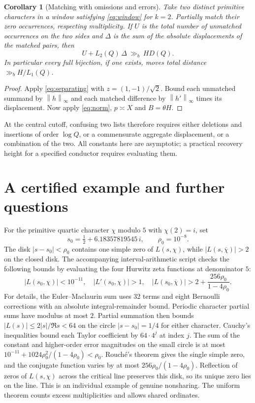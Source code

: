 \documentclass[11pt]{article}
\newtheorem{corollary}[theorem]{Corollary}
\newcommand{\norm}[1]{\left\lVert #1\right\rVert}
\begin{document}
\begin{corollary}[Matching with omissions and errors]\label{cor:matching}
Take two distinct primitive characters in a window satisfying \eqref{eq:window} for $k=2$. Partially match their zero occurrences, respecting multiplicity. If $U$ is the total number of unmatched occurrences on the two sides and $\Delta$ is the sum of the absolute displacements of the matched pairs, then
\[
 U+L_2(Q)\,\Delta\ \gg_b\ H D(Q).
\]
In particular every full bijection, if one exists, moves total distance $\gg_b H/L_1(Q)$.
\end{corollary}
\begin{proof}
Apply \eqref{eq:separating} with $z=(1,-1)/\sqrt2$. Bound each unmatched summand by $\norm h_\infty$ and each matched difference by $\norm{h'}_\infty$ times its displacement. Now apply \eqref{eq:norm}, $p\asymp X$ and $B=\theta H$.
\end{proof}

At the central cutoff, confusing two lists therefore requires either deletions and insertions of order $\log Q$, or a commensurate aggregate displacement, or a combination of the two. All constants here are asymptotic; a practical recovery height for a specified conductor requires evaluating them.

\section{A certified example and further questions}
For the primitive quartic character $\chi$ modulo $5$ with $\chi(2)=i$, set
\[
 s_0=\tfrac12+6.18357819545\,i,\qquad \rho_0=10^{-8}.
\]
The disk $|s-s_0|<\rho_0$ contains one simple zero of $L(s,\chi)$, while $|L(s,\overline\chi)|>2$ on the closed disk. The accompanying interval-arithmetic script checks the following bounds by evaluating the four Hurwitz zeta functions at denominator $5$:
\[
 |L(s_0,\chi)|<10^{-11},\quad |L'(s_0,\chi)|>1,\quad
 |L(s_0,\overline\chi)|>2+\frac{256\rho_0}{1-4\rho_0}.
\]
For details, the Euler--Maclaurin sum uses 32 terms and eight Bernoulli corrections with an absolute integral-remainder bound. Periodic character partial sums have modulus at most $2$. Partial summation then bounds $|L(s)|\le2|s|/\Re s<64$ on the circle $|s-s_0|=1/4$ for either character. Cauchy's inequalities bound each Taylor coefficient by $64\cdot4^j$ at index $j$. The sum of the constant and higher-order error magnitudes on the small circle is at most $10^{-11}+1024\rho_0^2/(1-4\rho_0)<\rho_0$. Rouch\'e's theorem gives the single simple zero, and the conjugate function varies by at most $256\rho_0/(1-4\rho_0)$. Reflection of zeros of $L(s,\chi)$ across the critical line preserves this disk, so its unique zero lies on the line. This is an individual example of genuine nonsharing. The uniform theorem counts excess multiplicities and allows shared ordinates.
\end{document}

